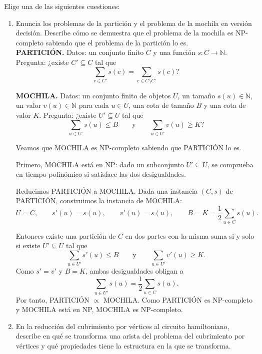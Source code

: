 \documentclass[12pt]{article}
\begin{document}
    \begin{ejercicio}[1.3 puntos]
        Elige una de las siguientes cuestiones:
        \begin{enumerate}
            \item Enuncia los problemas de la partición y el problema de la mochila en versión decisión. Describe cómo se demuestra que 
            el problema de la mochila es NP-completo sabiendo que el problema de la partición lo es. \\

            \textbf{PARTICIÓN.} Datos: un conjunto finito $C$ y una función $s:C\to \mathbb{N}$. Pregunta: ¿existe $C'\subseteq C$ tal que
            $$
            \sum_{c\in C'} s(c)=\sum_{c\in C\setminus C'} s(c)?
            $$

            \textbf{MOCHILA.} Datos: un conjunto finito de objetos $U$, un tamaño $s(u)\in\mathbb{N}$, un valor $v(u)\in\mathbb{N}$ para cada $u\in U$, una cota de tamaño $B$ y una cota de valor $K$. Pregunta: ¿existe $U'\subseteq U$ tal que
            $$
            \sum_{u\in U'} s(u)\leq B
            \qquad \text{y} \qquad
            \sum_{u\in U'} v(u)\geq K?
            $$

            Veamos que MOCHILA es NP-completo sabiendo que PARTICIÓN lo es.

            Primero, MOCHILA está en NP: dado un subconjunto $U'\subseteq U$, se comprueba en tiempo polinómico si satisface las dos desigualdades.

            Reducimos PARTICIÓN a MOCHILA. Dada una instancia $(C,s)$ de PARTICIÓN, construimos la instancia de MOCHILA:
            $$
            U=C,\qquad s'(u)=s(u),\qquad v'(u)=s(u),\qquad
            B=K=\frac{1}{2}\sum_{u\in C}s(u).
            $$

            Entonces existe una partición de $C$ en dos partes con la misma suma si y solo si existe $U'\subseteq U$ tal que
            $$
            \sum_{u\in U'}s'(u)\leq B
            \qquad \text{y} \qquad
            \sum_{u\in U'}v'(u)\geq K.
            $$
            Como $s'=v'$ y $B=K$, ambas desigualdades obligan a
            $$
            \sum_{u\in U'}s(u)=\frac{1}{2}\sum_{u\in C}s(u).
            $$
            Por tanto, PARTICIÓN $\propto$ MOCHILA. Como PARTICIÓN es NP-completo y MOCHILA está en NP, MOCHILA es NP-completo.
            
            \newpage

            \item En la reducción del cubrimiento por vértices al circuito hamiltoniano, describe en qué se transforma una arista 
            del problema del cubrimiento por vértices y qué propiedades tiene la estructura en la que se transforma. \\


\end{enumerate}
\end{ejercicio}
\end{document}
